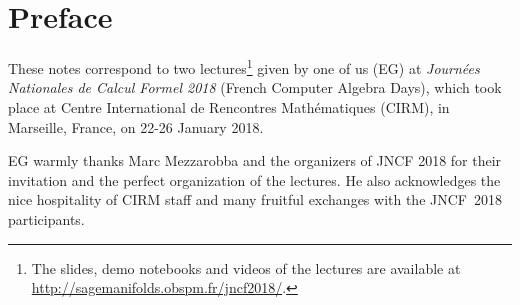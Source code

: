 \chapter*{Preface}
These notes correspond to two lectures\footnote{The slides, demo
notebooks and videos of the lectures are available at \url{http://sagemanifolds.obspm.fr/jncf2018/}.} given by one of us (EG)
at \emph{Journées Nationales de Calcul Formel 2018}  (French Computer Algebra Days),
which took place at Centre International de Rencontres Mathématiques (CIRM),
in Marseille, France, on 22-26 January 2018.

EG warmly thanks Marc Mezzarobba and the organizers of JNCF 2018 for their
invitation and the perfect organization of the lectures. He also acknowledges
the nice hospitality of CIRM staff and many fruitful exchanges with the JNCF~2018
participants.
